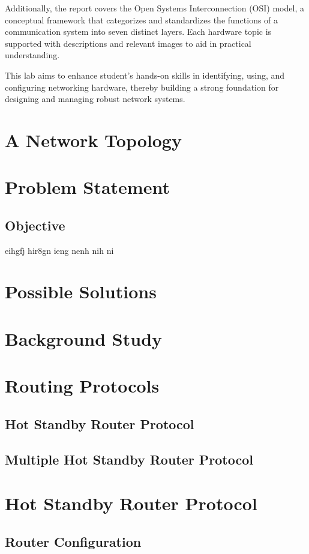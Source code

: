 \documentclass[12pt]{report}
\begin{document}
Additionally, the report covers the Open Systems Interconnection (OSI) model, a conceptual framework that categorizes and standardizes the functions of a communication system into seven distinct layers. Each hardware topic is supported with descriptions and relevant images to aid in practical understanding.

This lab aims to enhance student's hands-on skills in identifying, using, and configuring networking hardware, thereby building a strong foundation for designing and managing robust network systems.

\newpage

\chapter{A Network Topology}
\chapter{Problem Statement}
\section{Objective}
\newpage
eihgfj hir8gn ieng nenh nih ni
\chapter{Possible Solutions}
\chapter{Background Study}
\chapter{Routing Protocols}
\section{Hot Standby Router Protocol}
\section{Multiple Hot Standby Router Protocol}
\newpage

\chapter{Hot Standby Router Protocol}

\section{Router Configuration}
\end{document}

